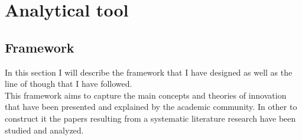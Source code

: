 
\chapter{Analytical tool} %

\label{Chapter4} %




\section{Framework}
In this section I will describe the framework that I have designed as well as the line of though that I have followed. \\
This framework aims to capture the main concepts and theories of innovation that have been presented and explained by the academic community.
In other to construct it the papers resulting from a systematic literature research have been studied and analyzed. 

